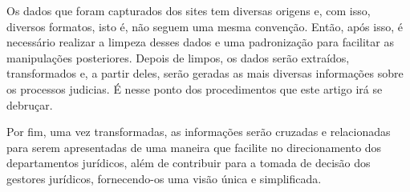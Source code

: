 Os dados que foram capturados dos sites tem diversas origens e, com isso, diversos formatos, isto é, não seguem uma mesma convenção. Então, após isso, é necessário realizar a limpeza desses dados e uma padronização para facilitar as manipulações posteriores. Depois de limpos, os dados serão extraídos, transformados e, a partir deles, serão geradas as mais diversas informações sobre os processos judicias. É nesse ponto dos procedimentos que este artigo irá se debruçar.

Por fim, uma vez transformadas, as informações serão cruzadas e relacionadas para serem apresentadas de uma maneira que facilite no direcionamento dos departamentos jurídicos, além de contribuir para a tomada de decisão dos gestores jurídicos, fornecendo-os uma visão única e simplificada.





